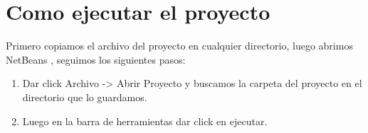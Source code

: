 \section{ Como ejecutar el proyecto}
Primero copiamos el archivo del proyecto en cualquier directorio, luego abrimos NetBeans , seguimos los siguientes pasos:
\begin{enumerate}
\item Dar click Archivo -> Abrir Proyecto y buscamos la carpeta del proyecto en el directorio que lo guardamos.
\item Luego en la barra de herramientas dar click en ejecutar.
\end{enumerate}
     
\begin{figure}[ht!]
 
   \centering
   \hspace{0.1\linewidth}
\hspace{0.1\linewidth}
\end{figure}

